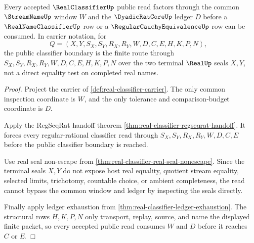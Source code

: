 \begin{theorem}
\label{thm:real-classifier-window-scope}
Every accepted $\RealClassifierUp$ public read factors through the common $\StreamNameUp$ window $W$ and the $\DyadicRatCoreUp$ ledger $D$ before a $\RealNameClassifierUp$ row or a $\RegularCauchyEquivalenceUp$ row can be consumed. In carrier notation, for
$$
Q=(X,Y,S_X,S_Y,R_X,R_Y,W,D,C,E,H,K,P,N),
$$
the public classifier boundary is the finite route through $S_X,S_Y,R_X,R_Y,W,D,C,E,H,K,P,N$ over the two terminal $\RealUp$ seals $X,Y$, not a direct equality test on completed real names.
\end{theorem}
\begin{proof}
Project the carrier of \autoref{def:real-classifier-carrier}. The only common inspection coordinate is $W$, and the only tolerance and comparison-budget coordinate is $D$.

Apply the RegSeqRat handoff theorem \autoref{thm:real-classifier-regseqrat-handoff}. It forces every regular-rational classifier read through $S_X,S_Y,R_X,R_Y,W,D,C,E$ before the public classifier boundary is reached.

Use real seal non-escape from \autoref{thm:real-classifier-real-seal-nonescape}. Since the terminal seals $X,Y$ do not expose host real equality, quotient stream equality, selected limits, trichotomy, countable choice, or ambient completeness, the read cannot bypass the common window and ledger by inspecting the seals directly.

Finally apply ledger exhaustion from \autoref{thm:real-classifier-ledger-exhaustion}. The structural rows $H,K,P,N$ only transport, replay, source, and name the displayed finite packet, so every accepted public read consumes $W$ and $D$ before it reaches $C$ or $E$.
\end{proof}


